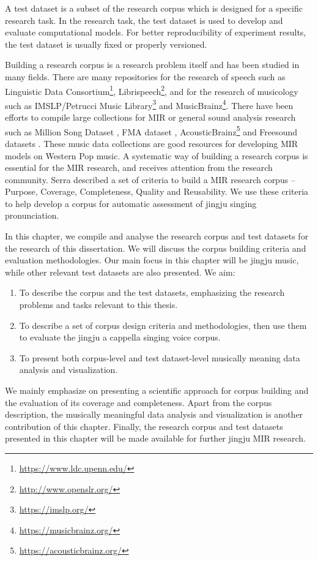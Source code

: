 A test dataset is a subset of the research corpus which is designed for a specific research task. In the research task, the test dataset is used to develop and evaluate computational models. For better reproducibility of experiment results, the test dataset is usually fixed or properly versioned.

Building a research corpus is a research problem itself and has been studied in many fields. There are many repositories for the research of speech such as Linguistic Data Consortium\footnote{\url{https://www.ldc.upenn.edu/}}, Librispeech\footnote{\url{http://www.openslr.org/}}, and for the research of musicology such as IMSLP/Petrucci Music Library\footnote{\url{https://imslp.org/}} and MusicBrainz\footnote{\url{https://musicbrainz.org/}}. There have been efforts to compile large collections for MIR or general sound analysis research such as Million Song Dataset \cite{Bertin-Mahieux2011a}, FMA dataset \cite{Defferrard2017}, AcousticBrainz\footnote{\url{https://acousticbrainz.org/}} and Freesound datasets \cite{Fonseca2017}. These music data collections are good resources for developing MIR models on Western Pop music. A systematic way of building a research corpus is essential for the MIR research, and receives attention from the research community. Serra \cite{Serra2014} described a set of criteria to build a MIR research corpus -- Purpose, Coverage, Completeness, Quality and Reusability. We use these criteria to help develop a corpus for automatic assessment of jingju singing pronunciation.

In this chapter, we compile and analyse the research corpus and test datasets for the research of this dissertation. We will discuss the corpus building criteria and evaluation methodologies. Our main focus in this chapter will be jingju music, while other relevant test datasets are also presented. We aim:

\begin{enumerate}[noitemsep]
\item To describe the corpus and the test datasets, emphasizing the research problems and tasks relevant to this thesis.
\item To describe a set of corpus design criteria and methodologies, then use them to evaluate the jingju a cappella singing voice corpus.
\item To present both corpus-level and test dataset-level musically meaning data analysis and visualization.
\end{enumerate}

We mainly emphasize on presenting a scientific approach for corpus building and the evaluation of its coverage and completeness. Apart from the corpus description, the musically meaningful data analysis and visualization is another contribution of this chapter. Finally, the research corpus and test datasets presented in this chapter will be made available for further jingju MIR research.

